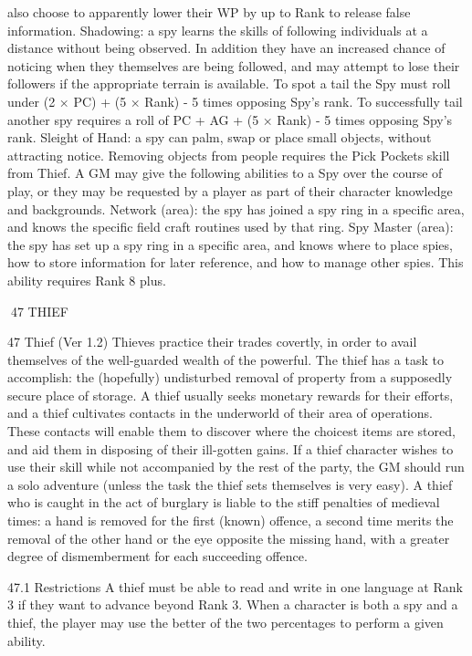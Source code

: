 \documentclass[a4paper]{article}
\begin{document}
\begin{multicols}{3}
also choose to apparently lower their WP by up to
Rank to release false information.
Shadowing: a spy learns the skills of following
individuals at a distance without being observed. In
addition they have an increased chance of noticing
when they themselves are being followed, and may
attempt to lose their followers if the appropriate
terrain is available. To spot a tail the Spy must roll
under (2 × PC) + (5 × Rank) - 5 times opposing
Spy’s rank. To successfully tail another spy requires a roll of PC + AG + (5 × Rank) - 5 times
opposing Spy’s rank.
Sleight of Hand: a spy can palm, swap or place
small objects, without attracting notice. Removing
objects from people requires the Pick Pockets skill
from Thief.
A GM may give the following abilities to a Spy
over the course of play, or they may be requested
by a player as part of their character knowledge
and backgrounds.
Network (area): the spy has joined a spy ring in a
specific area, and knows the specific field craft
routines used by that ring.
Spy Master (area): the spy has set up a spy ring in
a specific area, and knows where to place spies,
how to store information for later reference, and
how to manage other spies. This ability requires
Rank 8 plus.

47 THIEF

47 Thief (Ver 1.2)
Thieves practice their trades covertly, in order to
avail themselves of the well-guarded wealth of the
powerful. The thief has a task to accomplish: the
(hopefully) undisturbed removal of property from a
supposedly secure place of storage. A thief usually
seeks monetary rewards for their efforts, and a
thief cultivates contacts in the underworld of their
area of operations. These contacts will enable them
to discover where the choicest items are stored, and
aid them in disposing of their ill-gotten gains.
If a thief character wishes to use their skill while
not accompanied by the rest of the party, the GM
should run a solo adventure (unless the task the
thief sets themselves is very easy). A thief who is
caught in the act of burglary is liable to the stiff
penalties of medieval times: a hand is removed for
the first (known) offence, a second time merits the
removal of the other hand or the eye opposite the
missing hand, with a greater degree of dismemberment for each succeeding offence.

47.1 Restrictions
A thief must be able to read and write in one language at Rank 3 if they want to advance beyond
Rank 3.
When a character is both a spy and a thief, the
player may use the better of the two percentages to
perform a given ability.


\end{multicols}
\end{document}

